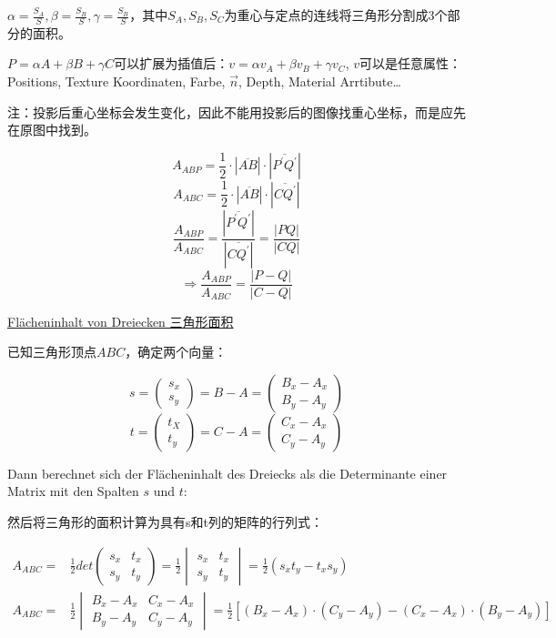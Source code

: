 \documentclass[fleqn]{article}
\begin{document}
$\alpha=\frac{S_A}{S},\beta=\frac{S_B}{S},\gamma=\frac{S_B}{S}$，其中$S_A,S_B,S_C$为重心与定点的连线将三角形分割成3个部分的面积。

$P=\alpha A + \beta B + \gamma C$可以扩展为插值后：$v=\alpha v_A + \beta v_B + \gamma v_C$, $v$可以是任意属性：Positions, Texture Koordinaten, Farbe, $\vec{n}$, Depth, Material Arrtibute\dots

注：投影后重心坐标会发生变化，因此不能用投影后的图像找重心坐标，而是应先在原图中找到。

$$A_{ABP} = \frac{1}{2} \cdot  |\overline{AB}| \cdot |\overline{P^{'}Q^{'}}|$$
$$A_{ABC} = \frac{1}{2} \cdot  |\overline{AB}| \cdot |\overline{CQ^{'}}|$$
$$\frac{A_{ABP}}{A_{ABC}} = \frac{|\overline{P^{'}Q^{'}}|}{|\overline{CQ^{'}}|} = \frac{|PQ|}{|CQ|}$$
$$\Rightarrow \frac{A_{ABP}}{A_{ABC}} = \frac{|P-Q|}{|C-Q|}$$

\noindent\underline{Flächeninhalt von Dreiecken 三角形面积}

已知三角形顶点$ABC$，确定两个向量：

$$s=\begin{pmatrix}
    s_x\\s_y
\end{pmatrix}=B-A=\begin{pmatrix}
    B_x-A_x\\B_y-A_y
\end{pmatrix}$$
$$t=\begin{pmatrix}
    t_X\\t_y
\end{pmatrix}=C-A=\begin{pmatrix}
    C_x-A_x\\C_y-A_y
\end{pmatrix}$$

Dann berechnet sich der Flächeninhalt des Dreiecks als die Determinante einer Matrix mit den Spalten $s$ und $t$:

然后将三角形的面积计算为具有s和t列的矩阵的行列式：

\begin{equation}
    \begin{aligned}
        A_{ABC} =& \frac{1}{2}det\begin{pmatrix}
            s_x & t_x\\s_y&t_y
        \end{pmatrix}=\frac{1}{2}\begin{vmatrix}
            s_x & t_x\\s_y&t_y
        \end{vmatrix}=\frac{1}{2}(s_xt_y-t_xs_y)\\
        A_{ABC} =& \frac{1}{2}\begin{vmatrix}
            B_x-A_x & C_x-A_x\\ B_y-A_y & C_y-A_y
        \end{vmatrix}=\frac{1}{2}[(B_x-A_x)\cdot(C_y-A_y)-(C_x-A_x)\cdot(B_y-A_y)]
    \end{aligned}
\end{equation}
\end{document}
